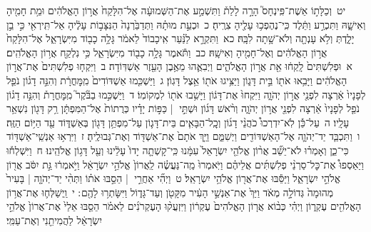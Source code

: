 \documentclass[18pt]{article}
\newcommand{\kri}[1]{\Afootnote{#1}}	%
\begin{document}
 {\loc יט~}וְכַלָּת֣וֹ אֵשֶׁת־פִּֽינְחָס֮ הָרָ֣ה לָלַת֒ וַתִּשְׁמַ֣ע אֶת־הַשְּׁמוּעָ֔ה אֶל־הִלָּקַח֙ אֲר֣וֹן הָאֱלֹהִ֔ים וּמֵ֥ת חָמִ֖יהָ וְאִישָׁ֑הּ וַתִּכְרַ֣ע וַתֵּ֔לֶד כִּֽי־נֶהֶפְכ֥וּ עָלֶ֖יהָ צִרֶֽיהָ׃ \startlock
 {\loc כ~}וּכְעֵ֣ת מוּתָ֗הּ וַתְּדַבֵּ֙רְנָה֙ הַנִּצָּב֣וֹת עָלֶ֔יהָ אַל־תִּֽירְאִ֖י כִּ֣י בֵ֣ן יָלָ֑דְתְּ וְלֹ֥א עָנְתָ֖ה וְלֹא־שָׁ֥תָה לִבָּֽהּ׃ \startlock
 {\loc כא~}וַתִּקְרָ֣א לַנַּ֗עַר אִֽיכָבוֹד֙ לֵאמֹ֔ר גָּלָ֥ה כָב֖וֹד מִיִּשְׂרָאֵ֑ל אֶל־הִלָּקַח֙ אֲר֣וֹן הָאֱלֹהִ֔ים וְאֶל־חָמִ֖יהָ וְאִישָֽׁהּ׃ \startlock
 {\loc כב~}וַתֹּ֕אמֶר גָּלָ֥ה כָב֖וֹד מִיִּשְׂרָאֵ֑ל כִּ֥י נִלְקַ֖ח אֲר֥וֹן הָאֱלֹהִֽים׃ 
\startlock
 {\loc א~}וּפְלִשְׁתִּים֙ לָֽקְח֔וּ אֵ֖ת אֲר֣וֹן הָאֱלֹהִ֑ים וַיְבִאֻ֛הוּ מֵאֶ֥בֶן הָעֵ֖זֶר אַשְׁדּֽוֹדָה׃ \startlock
 {\loc ב~}וַיִּקְח֤וּ פְלִשְׁתִּים֙ אֶת־אֲר֣וֹן הָאֱלֹהִ֔ים וַיָּבִ֥אוּ אֹת֖וֹ בֵּ֣ית דָּג֑וֹן וַיַּצִּ֥יגוּ אֹת֖וֹ אֵ֥צֶל דָּגֽוֹן׃ \startlock
 {\loc ג~}וַיַּשְׁכִּ֤מוּ אַשְׁדּוֹדִים֙  מִֽמׇּחֳרָ֔ת  וְהִנֵּ֣ה דָג֗וֹן נֹפֵ֤ל לְפָנָיו֙ אַ֔רְצָה לִפְנֵ֖י אֲר֣וֹן יְהֹוָ֑ה וַיִּקְחוּ֙ אֶת־דָּג֔וֹן וַיָּשִׁ֥בוּ אֹת֖וֹ לִמְקוֹמֽוֹ׃ \startlock
 {\loc ד~}וַיַּשְׁכִּ֣מוּ בַבֹּ֘קֶר֮  מִֽמׇּחֳרָת֒  וְהִנֵּ֣ה דָג֗וֹן נֹפֵ֤ל לְפָנָיו֙ אַ֔רְצָה לִפְנֵ֖י אֲר֣וֹן יְהֹוָ֑ה וְרֹ֨אשׁ דָּג֜וֹן וּשְׁתֵּ֣י  |  כַּפּ֣וֹת יָדָ֗יו כְּרֻתוֹת֙ אֶל־הַמִּפְתָּ֔ן רַ֥ק דָּג֖וֹן נִשְׁאַ֥ר עָלָֽיו׃ \startlock
 {\loc ה~}עַל־כֵּ֡ן לֹֽא־יִדְרְכוּ֩ כֹהֲנֵ֨י דָג֜וֹן וְכׇֽל־הַבָּאִ֧ים בֵּית־דָּג֛וֹן עַל־מִפְתַּ֥ן דָּג֖וֹן בְּאַשְׁדּ֑וֹד עַ֖ד הַיּ֥וֹם הַזֶּֽה׃ \startlock
 {\loc ו~}וַתִּכְבַּ֧ד יַד־יְהֹוָ֛ה אֶל־הָאַשְׁדּוֹדִ֖ים וַיְשִׁמֵּ֑ם וַיַּ֤ךְ אֹתָם֙  \edtext{(בעפלים)}{\kri{קרי: בַּטְּחֹרִ֔ים}}  אֶת־אַשְׁדּ֖וֹד וְאֶת־גְּבוּלֶֽיהָ׃ \startlock
 {\loc ז~}וַיִּרְא֥וּ אַנְשֵֽׁי־אַשְׁדּ֖וֹד כִּי־כֵ֑ן וְאָמְר֗וּ לֹא־יֵשֵׁ֞ב אֲר֨וֹן אֱלֹהֵ֤י יִשְׂרָאֵל֙ עִמָּ֔נוּ כִּֽי־קָשְׁתָ֤ה יָדוֹ֙ עָלֵ֔ינוּ וְעַ֖ל דָּג֥וֹן אֱלֹהֵֽינוּ׃ \startlock
 {\loc ח~}וַיִּשְׁלְח֡וּ וַיַּאַסְפוּ֩ אֶת־כׇּל־סַרְנֵ֨י פְלִשְׁתִּ֜ים אֲלֵיהֶ֗ם וַיֹּֽאמְרוּ֙ מַֽה־נַּעֲשֶׂ֗ה לַֽאֲרוֹן֙ אֱלֹהֵ֣י יִשְׂרָאֵ֔ל וַיֹּ֣אמְר֔וּ גַּ֣ת יִסֹּ֔ב אֲר֖וֹן אֱלֹהֵ֣י יִשְׂרָאֵ֑ל וַיַּסֵּ֕בּוּ אֶת־אֲר֖וֹן אֱלֹהֵ֥י יִשְׂרָאֵֽל׃ \startlock
 {\loc ט~}וַיְהִ֞י אַחֲרֵ֣י  |  הֵסַ֣בּוּ אֹת֗וֹ וַתְּהִ֨י יַד־יְהֹוָ֤ה  |  בָּעִיר֙ מְהוּמָה֙ גְּדוֹלָ֣ה מְאֹ֔ד וַיַּךְ֙ אֶת־אַנְשֵׁ֣י הָעִ֔יר מִקָּטֹ֖ן וְעַד־גָּד֑וֹל וַיִּשָּׂתְר֥וּ לָהֶ֖ם  \edtext{(עפלים)}{\kri{קרי: טְחֹרִֽים}} ׃ \startlock
 {\loc י~}וַֽיְשַׁלְּח֛וּ אֶת־אֲר֥וֹן הָאֱלֹהִ֖ים עֶקְר֑וֹן וַיְהִ֗י כְּב֨וֹא אֲר֤וֹן הָאֱלֹהִים֙ עֶקְר֔וֹן וַיִּזְעֲק֨וּ הָעֶקְרֹנִ֜ים לֵאמֹ֗ר הֵסַ֤בּוּ אֵלַי֙ אֶת־אֲרוֹן֙ אֱלֹהֵ֣י יִשְׂרָאֵ֔ל לַהֲמִיתֵ֖נִי וְאֶת־עַמִּֽי׃ \startlock
\end{document}
